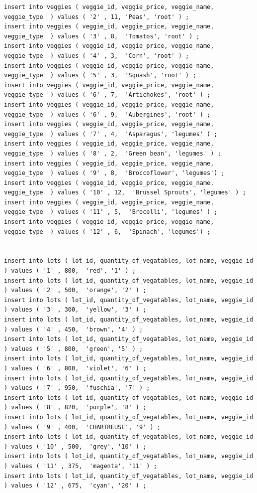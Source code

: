\begin{lstlisting}
insert into veggies ( veggie_id, veggie_price, veggie_name, veggie_type  ) values ( '2' , 11, 'Peas', 'root' ) ;
insert into veggies ( veggie_id, veggie_price, veggie_name, veggie_type  ) values ( '3' , 8,  'Tomatos', 'root' ) ;
insert into veggies ( veggie_id, veggie_price, veggie_name, veggie_type  ) values ( '4' , 3,  'Corn', 'root' ) ;
insert into veggies ( veggie_id, veggie_price, veggie_name, veggie_type  ) values ( '5' , 3,  'Squash', 'root' ) ;
insert into veggies ( veggie_id, veggie_price, veggie_name, veggie_type  ) values ( '6' , 7,  'Artichokes', 'root' ) ;
insert into veggies ( veggie_id, veggie_price, veggie_name, veggie_type  ) values ( '6' , 9,  'Aubergines', 'root' ) ;
insert into veggies ( veggie_id, veggie_price, veggie_name, veggie_type  ) values ( '7' , 4,  'Asparagus', 'legumes' ) ;
insert into veggies ( veggie_id, veggie_price, veggie_name, veggie_type  ) values ( '8' , 2,  'Green bean', 'legumes' ) ;
insert into veggies ( veggie_id, veggie_price, veggie_name, veggie_type  ) values ( '9' , 8,  'Broccoflower', 'legumes') ;
insert into veggies ( veggie_id, veggie_price, veggie_name, veggie_type  ) values ( '10' , 12,  'Brussel Sprouts', 'legumes' ) ;
insert into veggies ( veggie_id, veggie_price, veggie_name, veggie_type  ) values ( '11' , 5,  'Brocelli', 'legumes' ) ;
insert into veggies ( veggie_id, veggie_price, veggie_name, veggie_type  ) values ( '12' , 6,  'Spinach', 'legumes') ;


insert into lots ( lot_id, quantity_of_vegatables, lot_name, veggie_id ) values ( '1' , 800,  'red', '1' ) ; 
insert into lots ( lot_id, quantity_of_vegatables, lot_name, veggie_id ) values ( '2' , 500,  'orange', '2' ) ; 
insert into lots ( lot_id, quantity_of_vegatables, lot_name, veggie_id ) values ( '3' , 300,  'yellow', '3' ) ; 
insert into lots ( lot_id, quantity_of_vegatables, lot_name, veggie_id ) values ( '4' , 450,  'brown', '4' ) ; 
insert into lots ( lot_id, quantity_of_vegatables, lot_name, veggie_id ) values ( '5' , 800,  'green', '5' ) ; 
insert into lots ( lot_id, quantity_of_vegatables, lot_name, veggie_id ) values ( '6' , 800,  'violet', '6' ) ; 
insert into lots ( lot_id, quantity_of_vegatables, lot_name, veggie_id ) values ( '7' , 950,  'fuschia', '7' ) ; 
insert into lots ( lot_id, quantity_of_vegatables, lot_name, veggie_id ) values ( '8' , 820,  'purple', '8' ) ; 
insert into lots ( lot_id, quantity_of_vegatables, lot_name, veggie_id ) values ( '9' , 400,  'CHARTREUSE', '9' ) ; 
insert into lots ( lot_id, quantity_of_vegatables, lot_name, veggie_id ) values ( '10' , 500,  'grey', '10' ) ; 
insert into lots ( lot_id, quantity_of_vegatables, lot_name, veggie_id ) values ( '11' , 375,  'magenta', '11' ) ; 
insert into lots ( lot_id, quantity_of_vegatables, lot_name, veggie_id ) values ( '12' , 675,  'cyan', '20' ) ; 



\end{lstlisting}
